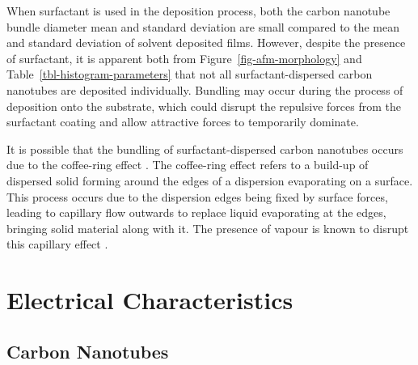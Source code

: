 \documentclass[
  a4paper,
]{scrbook}
\begin{document}
When surfactant is used in the deposition process, both the carbon
nanotube bundle diameter mean and standard deviation are small compared
to the mean and standard deviation of solvent deposited films. However,
despite the presence of surfactant, it is apparent both from
Figure~\ref{fig-afm-morphology} and Table~\ref{tbl-histogram-parameters}
that not all surfactant-dispersed carbon nanotubes are deposited
individually. Bundling may occur during the process of deposition onto
the substrate, which could disrupt the repulsive forces from the
surfactant coating and allow attractive forces to temporarily dominate.

It is possible that the bundling of surfactant-dispersed carbon
nanotubes occurs due to the coffee-ring effect
\autocite{Deegan1997,VanGaalen2021}. The coffee-ring effect refers to a
build-up of dispersed solid forming around the edges of a dispersion
evaporating on a surface. This process occurs due to the dispersion
edges being fixed by surface forces, leading to capillary flow outwards
to replace liquid evaporating at the edges, bringing solid material
along with it. The presence of vapour is known to disrupt this capillary
effect \autocite{Bishop2020}.

\hypertarget{sec-pristine-electrical-characterisation}{%
\section{Electrical
Characteristics}\label{sec-pristine-electrical-characterisation}}

\hypertarget{carbon-nanotubes}{%
\subsection{Carbon Nanotubes}\label{carbon-nanotubes}}
\end{document}
